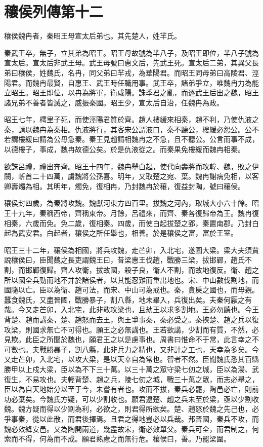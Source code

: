 \chapter{穰侯列傳第十二}

穰侯魏冉者，秦昭王母宣太后弟也。其先楚人，姓羋氏。

秦武王卒，無子，立其弟為昭王。昭王母故號為羋八子，及昭王即位，羋八子號為宣太后。宣太后非武王母。武王母號曰惠文后，先武王死。宣太后二弟，其異父長弟曰穰侯，姓魏氏，名冉，同父弟曰羋戎，為華陽君。而昭王同母弟曰高陵君、涇陽君。而魏冉最賢，自惠王、武王時任職用事。武王卒，諸弟爭立，唯魏冉力為能立昭王。昭王即位，以冉為將軍，衛咸陽。誅季君之亂，而逐武王后出之魏，昭王諸兄弟不善者皆滅之，威振秦國。昭王少，宣太后自治，任魏冉為政。

昭王七年，樗里子死，而使涇陽君質於齊。趙人樓緩來相秦，趙不利，乃使仇液之秦，請以魏冉為秦相。仇液將行，其客宋公謂液曰，秦不聽公，樓緩必怨公。公不若謂樓緩曰請為公毋急秦。秦王見趙請相魏冉之不急，且不聽公。公言而事不成，以德樓子，事成，魏冉故德公矣。於是仇液從之。而秦果免樓緩而魏冉相秦。

欲誅呂禮，禮出奔齊。昭王十四年，魏冉舉白起，使代向壽將而攻韓、魏，敗之伊闕，斬首二十四萬，虜魏將公孫喜。明年，又取楚之宛、葉。魏冉謝病免相，以客卿壽燭為相。其明年，燭免，復相冉，乃封魏冉於穰，復益封陶，號曰穰侯。

穰侯封四歲，為秦將攻魏。魏獻河東方四百里。拔魏之河內，取城大小六十餘。昭王十九年，秦稱西帝，齊稱東帝。月餘，呂禮來，而齊、秦各復歸帝為王。魏冉復相秦，六歲而免。免二歲，復相秦。四歲，而使白起拔楚之郢，秦置南郡。乃封白起為武安君。白起者，穰侯之所任舉也，相善。於是穰侯之富，富於王室。

昭王三十二年，穰侯為相國，將兵攻魏，走芒卯，入北宅，遂圍大梁。梁大夫須賈說穰侯曰，臣聞魏之長吏謂魏王曰，昔梁惠王伐趙，戰勝三梁，拔邯鄲，趙氏不割，而邯鄲復歸。齊人攻衛，拔故國，殺子良，衛人不割，而故地復反。衛、趙之所以國全兵勁而地不并於諸侯者，以其能忍難而重出地也。宋、中山數伐割地，而國隨以亡。臣以為衛、趙可法，而宋、中山可為戒也。秦，貪戾之國也，而毋親。蠶食魏氏，又盡晉國，戰勝暴子，割八縣，地未畢入，兵復出矣。夫秦何厭之有哉。今又走芒卯，入北宅，此非敢攻梁也，且劫王以求多割地。王必勿聽也。今王背楚、趙而講秦，楚、趙怒而去王，與王爭事秦，秦必受之。秦挾楚、趙之兵以復攻梁，則國求無亡不可得也。願王之必無講也。王若欲講，少割而有質，不然，必見欺。此臣之所聞於魏也，願君王之以是慮事也。周書曰惟命不于常，此言幸之不可數也。夫戰勝暴子，割八縣，此非兵力之精也，又非計之工也，天幸為多矣。今又走芒卯，入北宅，以攻大梁，是以天幸自為常也。智者不然。臣聞魏氏悉其百縣勝甲以上戍大梁，臣以為不下三十萬。以三十萬之眾守梁七仞之城，臣以為湯、武復生，不易攻也。夫輕背楚、趙之兵，陵七仞之城，戰三十萬之眾，而志必舉之，臣以為自天地始分以至于今，未嘗有者也。攻而不拔，秦兵必罷，陶邑必亡，則前功必棄矣。今魏氏方疑，可以少割收也。願君逮楚、趙之兵未至於梁，亟以少割收魏。魏方疑而得以少割為利，必欲之，則君得所欲矣。楚、趙怒於魏之先己也，必爭事秦，從以此散，而君後擇焉。且君之得地豈必以兵哉。邦晉國，秦兵不攻，而魏必效絳安邑。又為陶開兩道，幾盡故宋，衛必效單父。秦兵可全，而君制之，何索而不得，何為而不成。願君熟慮之而無行危。穰侯曰，善。乃罷梁圍。


